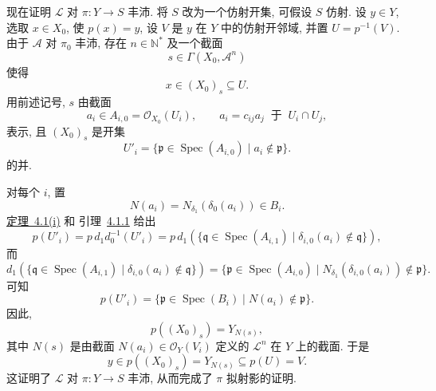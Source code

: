 现在证明 \(\mathscr L\) 对 \(\pi:Y\to S\) 丰沛.
将 \(S\) 改为一个仿射开集, 可假设 \(S\) 仿射.
设 \(y\in Y\), 选取 \(x\in X_0\), 使 \(p(x)=y\),
设 \(V\) 是 \(y\) 在 \(Y\) 中的仿射开邻域,
并置 \(U=p^{-1}(V)\). 由于 \(\mathscr A\) 对 \(\pi_0\) 丰沛,
存在 \(n\in\mathbb N^\ast\) 及一个截面
\[
  s\in\Gamma(X_0,\mathscr A^n)
\]
使得
\[
  x\in(X_0)_s\subseteq U.
\]
用前述记号, \(s\) 由截面
\[
  a_i\in A_{i,0}=\mathcal O_{X_0}(U_i),
  \qquad a_i=c_{ij}a_j\ \text{ 于 }\ U_i\cap U_j,
\]
表示, 且 \((X_0)_s\) 是开集
\[
  U'_i=\{\mathfrak p\in\operatorname{Spec}(A_{i,0})
    \mid a_i\notin\mathfrak p\}.
\]
的并.

对每个 \(i\), 置
\[
  N(a_i)=N_{\delta_1}(\delta_0(a_i))\in B_i.
\]
\hyperref[thm:sga3-V-4.1-i]{定理~4.1(i)} 和
引理~\hyperref[lem:sga3-V-4.1.1]{4.1.1} 给出
\[
  p(U'_i)
  =p\,d_1d_0^{-1}(U'_i)
  =p\,d_1\!\left(
    \{\mathfrak q\in\operatorname{Spec}(A_{i,1})
      \mid\delta_{i,0}(a_i)\notin\mathfrak q\}
    \right),
\]
而
\[
  d_1\!\left(
    \{\mathfrak q\in\operatorname{Spec}(A_{i,1})
      \mid\delta_{i,0}(a_i)\notin\mathfrak q\}
    \right)
  =
  \{\mathfrak p\in\operatorname{Spec}(A_{i,0})
    \mid N_{\delta_1}(\delta_{i,0}(a_i))\notin\mathfrak p\}.
\]
可知
\[
  p(U'_i)
  =
  \{\mathfrak p\in\operatorname{Spec}(B_i)
    \mid N(a_i)\notin\mathfrak p\}.
\]
因此,
\[
  p((X_0)_s)=Y_{N(s)},
\]
其中 \(N(s)\) 是由截面 \(N(a_i)\in\mathcal O_Y(V_i)\)
定义的 \(\mathscr L^n\) 在 \(Y\) 上的截面. 于是
\begin{equation}
  y\in p((X_0)_s)=Y_{N(s)}\subseteq p(U)=V.
  \tag{*}\label{eq:sga3-V-5.1-star}
\end{equation}
这证明了 \(\mathscr L\) 对 \(\pi:Y\to S\) 丰沛,
从而完成了 \(\pi\) 拟射影的证明.

